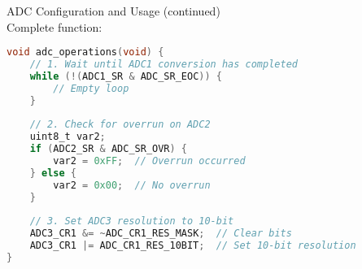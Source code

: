 \begin{example2}{ADC Configuration and Usage (continued)}\\
Complete function:
\begin{lstlisting}[language=C, style=basesmol]
void adc_operations(void) {
    // 1. Wait until ADC1 conversion has completed
    while (!(ADC1_SR & ADC_SR_EOC)) {
        // Empty loop
    }
    
    // 2. Check for overrun on ADC2
    uint8_t var2;
    if (ADC2_SR & ADC_SR_OVR) {
        var2 = 0xFF;  // Overrun occurred
    } else {
        var2 = 0x00;  // No overrun
    }
    
    // 3. Set ADC3 resolution to 10-bit
    ADC3_CR1 &= ~ADC_CR1_RES_MASK;  // Clear bits
    ADC3_CR1 |= ADC_CR1_RES_10BIT;  // Set 10-bit resolution
}
\end{lstlisting}
\end{example2}